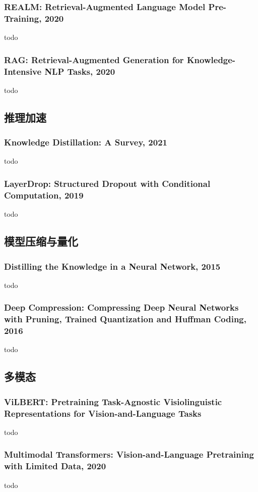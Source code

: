 \documentclass[twocolumn, 10pt]{article} %
\begin{document}
\subsubsection{REALM: Retrieval-Augmented Language Model Pre-Training, 2020}
todo
\subsubsection{RAG: Retrieval-Augmented Generation for Knowledge-Intensive NLP Tasks, 2020}
todo


\subsection{推理加速}
\subsubsection{Knowledge Distillation: A Survey, 2021}
todo 

\subsubsection{LayerDrop: Structured Dropout with Conditional Computation, 2019}
todo 

\subsection{模型压缩与量化}

\subsubsection{Distilling the Knowledge in a Neural Network, 2015}
todo 


\subsubsection{Deep Compression: Compressing Deep Neural Networks with Pruning, Trained Quantization and Huffman Coding, 2016}
todo 


\subsection{多模态}
\subsubsection{ViLBERT: Pretraining Task-Agnostic Visiolinguistic Representations for Vision-and-Language Tasks}
todo
\subsubsection{Multimodal Transformers: Vision-and-Language Pretraining with Limited Data, 2020}
todo
\end{document}
